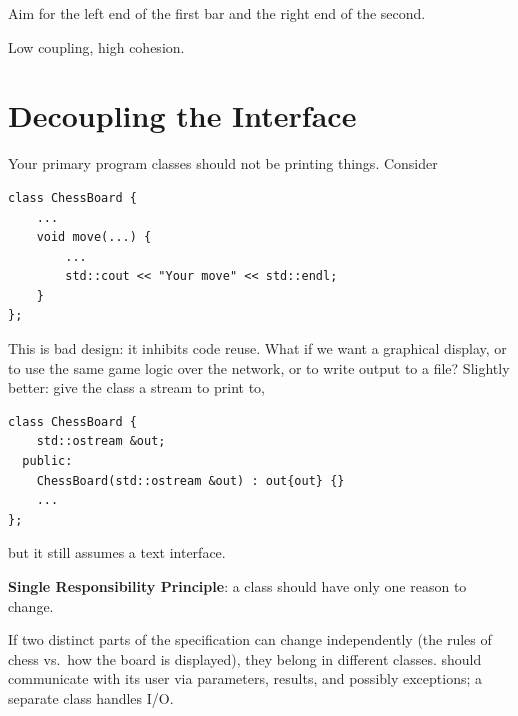 \begin{center}

\small Aim for the left end of the first bar and the right end of the second.
\end{center}

\begin{important}[Goal]
Low coupling, high cohesion.
\end{important}

\section{Decoupling the Interface}
Your primary program classes should not be printing things. Consider
\begin{lstlisting}[style=cpp]
class ChessBoard {
    ...
    void move(...) {
        ...
        std::cout << "Your move" << std::endl;
    }
};
\end{lstlisting}
This is bad design: it inhibits code reuse. What if we want a graphical display,
or to use the same game logic over the network, or to write output to a file?
Slightly better: give the class a stream to print to,
\begin{lstlisting}[style=cpp]
class ChessBoard {
    std::ostream &out;
  public:
    ChessBoard(std::ostream &out) : out{out} {}
    ...
};
\end{lstlisting}
but it still assumes a text interface.

\begin{definition}
\textbf{Single Responsibility Principle}: a class should have only one reason to
change.
\end{definition}
If two distinct parts of the specification can change independently (the rules
of chess vs.\ how the board is displayed), they belong in different classes.
 should communicate with its user via parameters, results, and
possibly exceptions; a separate class handles I/O.

